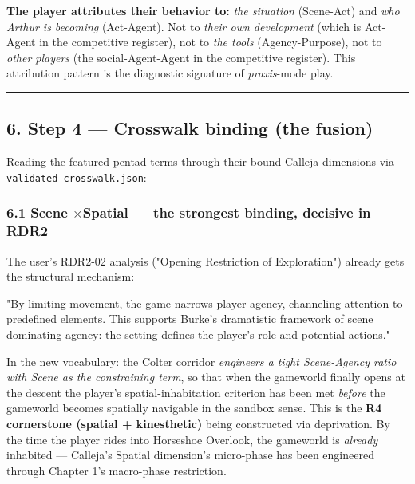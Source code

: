 \documentclass[11pt]{report}
\begin{document}
\textbf{The player attributes their behavior to:} \textit{the situation} (Scene-Act) and \textit{who Arthur is becoming} (Act-Agent). Not to \textit{their own development} (which is Act-Agent in the competitive register), not to \textit{the tools} (Agency-Purpose), not to \textit{other players} (the social-Agent-Agent in the competitive register). This attribution pattern is the diagnostic signature of \textit{praxis}-mode play.


\vspace{0.4em}\hrule\vspace{0.8em}


\subsection{6. Step 4 — Crosswalk binding (the fusion)}


Reading the featured pentad terms through their bound Calleja dimensions via \texttt{validated-\discretionary{}{}{}crosswalk.\discretionary{}{}{}json}:


\subsubsection{6.1 Scene $\times$\allowbreak  Spatial — the strongest binding, decisive in RDR2}


The user's RDR2-02 analysis ("Opening Restriction of Exploration") already gets the structural mechanism:


\begin{diabox}
"By limiting movement, the game narrows player agency, channeling attention to predefined elements. This supports Burke's dramatistic framework of scene dominating agency: the setting defines the player's role and potential actions."

\end{diabox}


In the new vocabulary: the Colter corridor \textit{engineers a tight Scene-Agency ratio with Scene as the constraining term}, so that when the gameworld finally opens at the descent the player's spatial-inhabitation criterion has been met \textit{before} the gameworld becomes spatially navigable in the sandbox sense. This is the \textbf{R4 cornerstone (spatial + kinesthetic)} being constructed via deprivation. By the time the player rides into Horseshoe Overlook, the gameworld is \textit{already} inhabited — Calleja's Spatial dimension's micro-phase has been engineered through Chapter 1's macro-phase restriction.
\end{document}
